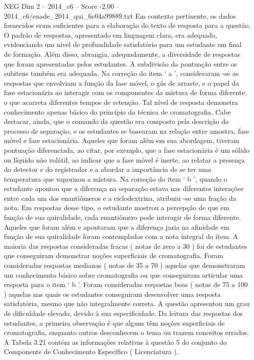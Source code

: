 \begin{textsample}{NEG Dim 2 – 2014\_c6 – Score -2.00 – 2014\_c6/enade\_2014\_qui\_6c04a99889.txt}
Em contexto pertinente, os dados fornecidos eram suficientes para a elaboração do texto de resposta para a questão.
O padrão de respostas, apresentado em linguagem clara, era adequado, evidenciando um nível de profundidade satisfatório para um estudante em final de formação.
Além disso, abrangia, adequadamente, a diversidade de respostas que foram apresentadas pelos estudantes.
A subdivisão da pontuação entre os subitens também era adequada.
Na correção do item ‘ a ’, consideraram -se as respostas que envolviam a função da fase móvel, o gás de arraste, e o papel da fase estacionária ao interagir com os componentes da mistura de forma diferente, o que acarreta diferentes tempos de retenção.
Tal nível de resposta demonstra conhecimento apenas básico do princípio da técnica de cromatografia.
Cabe destacar, ainda, que o comando da questão era composto pela descrição do processo de separação, e os estudantes se basearam na relação entre amostra, fase móvel e fase estacionária.
Aqueles que foram além em sua abordagem, tiveram pontuação diferenciada, ao citar, por exemplo, que a fase estacionária é um sólido ou líquido não volátil, ao indicar que a fase móvel é inerte, ao relatar a presença do detector e do registrador e a abordar a importância de se ter uma temperatura que vaporizou a mistura.
Na correção do item ‘ b ’, quando o estudante apontou que a diferença na separação estava nas diferentes interações entre cada um dos enantiômeros e a ciclodextrina, atribuiu -se uma fração da nota.
Em respostas desse tipo, o estudante mostrou a percepção de que em função de sua quiralidade, cada enantiômero pode interagir de forma diferente.
Aqueles que foram além e apontaram que a diferença jazia na afinidade em função de sua quiralidade foram contemplados com a nota integral do item.
A maioria das respostas consideradas fracas ( notas de zero a 30 ) foi de estudantes que conseguiram demonstrar noções superficiais de cromatografia.
Foram consideradas respostas medianas ( notas de 35 a 70 ) aquelas que demonstraram um conhecimento básico sobre cromatografia ou que conseguiram articular uma resposta para o item ‘ b ’.
Foram consideradas respostas boas ( notas de 75 a 100 ) aquelas nas quais os estudantes conseguiram desenvolver uma resposta satisfatória, mesmo que não integralmente correta.
A questão apresentou um grau de dificuldade elevado, devido à sua especificidade.
Da leitura das respostas dos estudantes, a primeira observação é que alguns têm noções superficiais de cromatografia, enquanto outros desconhecem o tema ou trazem conceitos errados.
A Tabela 3.21 contém as informações relativas à questão 5 do conjunto do Componente de Conhecimento Específico ( Licenciatura ).

\end{textsample}
